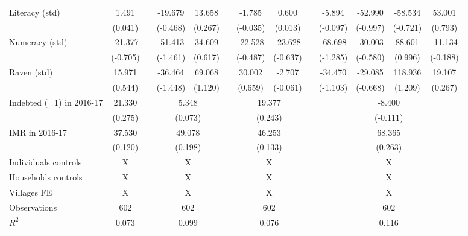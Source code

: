 \begin{table}[htbp]
{\begin{tabular}{lcccccccccccc}
    Literacy (std) & 1.491 &       & -19.679 & 13.658 &       & -1.785 & 0.600 &       & -5.894 & -52.990 & -58.534 & 53.001 \\
          & (0.041) &       & (-0.468) & (0.267) &       & (-0.035) & (0.013) &       & (-0.097) & (-0.997) & (-0.721) & (0.793) \\
    Numeracy (std) & -21.377 &       & -51.413 & 34.609 &       & -22.528 & -23.628 &       & -68.698 & -30.003 & 88.601 & -11.134 \\
          & (-0.705) &       & (-1.461) & (0.617) &       & (-0.487) & (-0.637) &       & (-1.285) & (-0.580) & (0.996) & (-0.188) \\
    Raven (std) & 15.971 &       & -36.464 & 69.068 &       & 30.002 & -2.707 &       & -34.470 & -29.085 & 118.936 & 19.107 \\
          & (0.544) &       & (-1.448) & (1.120) &       & (0.659) & (-0.061) &       & (-1.103) & (-0.668) & (1.209) & (0.267) \\
\cmidrule{1-2}\cmidrule{4-5}\cmidrule{7-8}\cmidrule{10-13}    Indebted (=1) in 2016-17 & 21.330 &       & \multicolumn{2}{c}{5.348} &       & \multicolumn{2}{c}{19.377} &       & \multicolumn{4}{c}{-8.400} \\
          & (0.275) &       & \multicolumn{2}{c}{(0.073)} &       & \multicolumn{2}{c}{(0.243)} &       & \multicolumn{4}{c}{(-0.111)} \\
    IMR in 2016-17 & 37.530 &       & \multicolumn{2}{c}{49.078} &       & \multicolumn{2}{c}{46.253} &       & \multicolumn{4}{c}{68.365} \\
          & (0.120) &       & \multicolumn{2}{c}{(0.198)} &       & \multicolumn{2}{c}{(0.133)} &       & \multicolumn{4}{c}{(0.263)} \\
    Individuals controls & X     &       & \multicolumn{2}{c}{X} &       & \multicolumn{2}{c}{X} &       & \multicolumn{4}{c}{X} \\
    Households controls & X     &       & \multicolumn{2}{c}{X} &       & \multicolumn{2}{c}{X} &       & \multicolumn{4}{c}{X} \\
    Villages FE & X     &       & \multicolumn{2}{c}{X} &       & \multicolumn{2}{c}{X} &       & \multicolumn{4}{c}{X} \\
    \midrule
    Observations & 602   &       & \multicolumn{2}{c}{602} &       & \multicolumn{2}{c}{602} &       & \multicolumn{4}{c}{602} \\
    $R^2$ & 0.073 &       & \multicolumn{2}{c}{0.099} &       & \multicolumn{2}{c}{0.076} &       & \multicolumn{4}{c}{0.116} \\

\end{tabular}}
\end{table}
